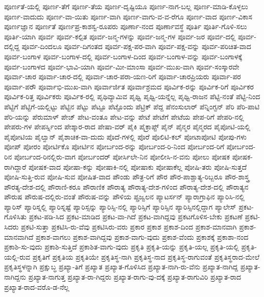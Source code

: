 {ಪೂರ್ಣತೆ-ಯಲ್ಲಿ
ಪೂರ್ಣ-ತೆಗೆ
ಪೂರ್ಣ-ತೆಯ
ಪೂರ್ಣ-ದೃಷ್ಟಿಯೂ
ಪೂರ್ಣ-ನಾಗ-ಬಲ್ಲ
ಪೂರ್ಣ-ಮಾಡಿ-ಕೊಳ್ಳಲು
ಪೂರ್ಣ-ವಾದುದು
ಪೂರ್ಣ-ವಾ-ಯಿತು
ಪೂರ್ಣ-ವಾಗಿ
ಪೂರ್ಣ-ವಾಗು-ವ-ವ-ರೆಗೂ
ಪೂರ್ಣ-ವಾದ
ಪೂರ್ಣ-ವಿಕಾಸ
ಪೂರ್ಣಜ್ಞಾನ
ಪೂರ್ಣತೆ
ಪೂರ್ಣಪ್ರ-ಕಾಶಸ್ವ-ರೂಪರು
ಪೂರ್ಣಾ-ನಂದ
ಪೂರ್ಣಾವಸ್ಥೆ
ಪೂರ್ತಿ
ಪೂರ್ತಿ-ಗೊಳಿ-ಸಲು
ಪೂರ್ತಿ-ಯಾಗಿ
ಪೂರ್ವ
ಪೂರ್ವ-ಕಲ್ಪಿತ
ಪೂರ್ವ-ಜನ್ಮ-ಗಳನ್ನು
ಪೂರ್ವ-ಜನ್ಮ-ಗಳ
ಪೂರ್ವ-ಜರ
ಪೂರ್ವ-ದಲ್ಲಿ
ಪೂರ್ವ-ದಲ್ಲಿದ್ದ
ಪೂರ್ವ-ದಿಂದಲೂ
ಪೂರ್ವ-ದಿಗಂತದ
ಪೂರ್ವ-ಪಕ್ಷ-ಪರ-ವಾಗಿ
ಪೂರ್ವ-ಪಕ್ಷ-ವನ್ನು
ಪೂರ್ವ-ಪರಿಚಿತ-ವಾದ
ಪೂರ್ವ-ಬಂಗಾಳ
ಪೂರ್ವ-ಬಂಗಾಳ-ದಲ್ಲಿ
ಪೂರ್ವ-ಬಂಗಾಳ-ದಿಂದ
ಪೂರ್ವ-ಬಂಗಾಳ-ವನ್ನು
ಪೂರ್ವ-ಬಂಗಾಳಕ್ಕೆ
ಪೂರ್ವ-ಬಂಗಾಳದ
ಪೂರ್ವ-ಭಾವಿ-ಯಾಗಿ
ಪೂರ್ವ-ಮೀ-ಮಾಂಸಾ
ಪೂರ್ವ-ಮುಖ-ವಾಗಿ
ಪೂರ್ವ-ಸಂಸ್ಕಾರವೇ
ಪೂರ್ವಾ-ಚಾರ
ಪೂರ್ವಾ-ಚಾರ-ದಲ್ಲಿ
ಪೂರ್ವಾ-ಚಾರ-ಪರಾ-ಯಣ-ರಿಗೆ
ಪೂರ್ವಾ-ಚಾರಪ್ರಿಯರು
ಪೂರ್ವಾ-ಪರ
ಪೂರ್ವಾ-ಪರೌ
ಪೂರ್ವಾಭಿ-ಮುಖ-ವಾಗಿ
ಪೂರ್ವಾರ್ಜಿತ
ಪೂರ್ವಾಶ್ರಮದ
ಪೂರ್ವಿಕ-ರನ್ನು
ಪೂರ್ವಿಕ-ರಿಗೆ
ಪೂರ್ವಿಕರ
ಪೂರ್ವಿಕ-ರಿತ್ತ
ಪೂರ್ವಿಕರು
ಪೂರ್ವಿಕ-ರಲ್ಲಿ
ಪೃಥಿವ್ಯಾಮಿವ
ಪೃಥ್ವಿ
ಪೃಥ್ವಿ-ಯನ್ನೆಲ್ಲ
ಪೃಥ್ವಿ-ರಾಜನ
ಪೆಟ್ಟಿ-ನಂತೆ
ಪೆಟ್ಟಿ-ನಿಂದ
ಪೆಟ್ಟಿಗೆ
ಪೆಟ್ಟಿಗೆ-ಯಲ್ಲಿಟ್ಟು
ಪೆಟ್ಟಿನ
ಪೆಟ್ಟು
ಪೆಟ್ಟೂ
ಪೆಟ್ಟೊಂದು
ಪೆಟ್ರಿಕ್
ಪೆದ್ದ
ಪೆನಂಸುಲಾರ್
ಪೆನ್ನಿಂಗ್ಟನ್
ಪೆರಿ
ಪೆರಿ-ಪಾಟಿ
ಪೆರಿ-ಯನ್ನು
ಪೆರುಮಾಳ್
ಪೇಜ್
ಪೇಟ-ವಂತೂ
ಪೇಟ-ವನ್ನು
ಪೇಟೆ
ಪೇಟೆಗೆ
ಪೇಟೆಯ
ಪೇಪ-ರಿಗೆ
ಪೇಪರಿ-ನಲ್ಲಿ
ಪೇಪರು-ಗಳ
ಪೇಪರ್ಸ್ನಿಂದ
ಪೇಶ್ಕಾರ-ರಾದ
ಪೇಷಾ-ವರ್
ಪೈಕಿ
ಪೈಕ್ರಾಪ್ಟ್
ಪೈನ್
ಪೈನ್ಮರ
ಪೈನ್ಮರದ
ಪೈಪೋಟಿ-ಯಲ್ಲಿ
ಪೈಪೋಟಿಯ
ಪೈಲ್ವಾನ್
ಪೈಶಾಚಿಕ-ವಾ-ದುದು
ಪೊದೆ-ಗಳಲ್ಲಿ
ಪೊರೆ
ಪೊಲಿಟಿ-ಕಲ್
ಪೋಟಾಪೋಟಿ
ಪೋಪು-ಗಳು
ಪೋಪ್
ಪೋರಂ
ಪೋರ್ಟಿಕೊ
ಪೋರ್ಟಿನ
ಪೋರ್ಬಂದ-ರನ್ನು
ಪೋರ್ಬಂದ-ರಿ-ನಿಂದ
ಪೋರ್ಬಂದ-ರಿಗೆ
ಪೋರ್ಬಂದ-ರಿನ
ಪೋರ್ಬಂದ-ರಿನಲ್ಲಿರು-ವಾಗ
ಪೋರ್ಬಂದರ್
ಪೋರ್ಸಿಲೇ-ನಿನ
ಪೋಲೀಸಿ-ನ-ವನು
ಪೋಲು
ಪೋಷಕ
ಪೋಷಕ-ರಾಗಿದ್ದಾರೆ
ಪೋಷಕ-ವಾದ
ಪೋಷಾ-ಕನ್ನು
ಪೋಷಾಕಿ-ನಲ್ಲಿ
ಪೋಷಾಕು
ಪೋಷಾಕೆಲ್ಲ
ಪೋಷಿ-ತರು
ಪೋಷಿ-ಸುತ್ತದೆ
ಪೋಷಿ-ಸುತ್ತಿ-ರುವ
ಪೋಷಿ-ಸುವ
ಪೋಷಿತ-ವಾದ
ಪೌಂಡು
ಪೌತ್ರ-ರಿಗೆ
ಪೌರ
ಪೌರ-ಪಾಶ್ಚಾತ್ಯ-ರಿಬ್ಬರೂ
ಪೌರ-ಶಾಸ್ತ್ರ
ಪೌರತ್ಯ-ದೇಶ-ದಲ್ಲಿ
ಪೌರಾಣಿ-ಕರೂ
ಪೌರಾಣಿಕ
ಪೌರಾತ್ಯ
ಪೌರಾತ್ಯ-ದೇಶ-ಗಳಿಂದ
ಪೌರಾತ್ಯ-ದೇಶ-ದಲ್ಲಿ
ಪೌರಾತ್ಯನ
ಪೌರುಷ
ಪೌರುಷ-ದಲ್ಲಿರು-ವಂತೆ
ಪೌರುಷ-ವನ್ನು
ಪೌಳಿಯ
ಪ್ಪ್ರಜ್ವಲನ
ಪ್ಯಾಟರ್ಸನ್
ಪ್ಯಾರಾಗ್ರಾಫಿನ
ಪ್ಯಾರಿಸಿ-ನಲ್ಲಿ
ಪ್ಯಾರಿಸ್
ಪ್ಯಾರಿಸ್ನಲ್ಲಿ
ಪ್ಯಾರಿಸ್ನಷ್ಟೆ
ಪ್ಯಾರಿಸ್ಸನ್ನು
ಪ್ಯಾರಿಸ್ಸಿ-ನಲ್ಲಿ
ಪ್ಯಾರಿಸ್ಸಿಗೆ
ಪ್ಯಾರಿಸ್ಸಿನ
ಪ್ಯಾರಿಸ್ಸಿನಲ್ಲಿದ್ದಾಗ
ಪ್ಯಾಲೇಸ್
ಪ್ರಕಟ-ಗೊಳಿಸಿತು
ಪ್ರಕಟ-ಪಡಿ-ಸಿದ
ಪ್ರಕಟ-ಮಾಡಿದ
ಪ್ರಕಟ-ವಾ-ಗಿದೆ
ಪ್ರಕಟ-ವಾಗಿದ್ದವು
ಪ್ರಕಟಗೊಳಿಸ-ಬೇಕು
ಪ್ರಕಟಣೆ
ಪ್ರಕಟಿ-ಸಿದರು
ಪ್ರಕಟಿ-ಸುತ್ತಾ
ಪ್ರಕಟಿಸಿ-ರು-ವೆವು
ಪ್ರಕಟಿಸಿರು-ವರು
ಪ್ರಕಾರ
ಪ್ರಕಾಶ
ಪ್ರಕಾಶ-ದಿಂದ
ಪ್ರಕಾಶ-ಮಾನವಾಗಿ
ಪ್ರಕಾಶ-ಮಾನವಾಗಿದೆ
ಪ್ರಕಾಶ-ವಾಗಲು
ಪ್ರಕಾಶ-ವಾಗಿದ್ದವು
ಪ್ರಕಾಶ-ವಾಗು-ವುದು
ಪ್ರಕಾಶ-ವೆಂದು
ಪ್ರಕಾಶಕ್ಕೆ
ಪ್ರಕಾಶಾ-ನಂದ
ಪ್ರಕಾಶಿ-ಸು-ವುದು
ಪ್ರಕಾಶಿ-ಸುತ್ತಿದೆ
ಪ್ರಕಾಶಿತ-ವಾಗು-ವುದು
ಪ್ರಕೃತಿ
ಪ್ರಕೃತಿ-ಯನ್ನು
ಪ್ರಕೃತಿ-ಯಲ್ಲ
ಪ್ರಕೃತಿ-ಯಲ್ಲಿ
ಪ್ರಕೃತಿ-ಯಲ್ಲಿ-ರುವ
ಪ್ರಕೃತಿಗೆ
ಪ್ರಕೃತಿಯ
ಪ್ರಕೃತಿಯೇ
ಪ್ರಕೃತಿಸ್ಥ-ನಾಗಿ
ಪ್ರಕೃತಿಸ್ಥ-ನಾದ
ಪ್ರಕೃತಿಸ್ಥ-ರಾಗುವಂತೆ
ಪ್ರಕೃತಿಸ್ಥರಾದ-ಮೇಲೆ
ಪ್ರಕೃತಿಸ್ಥಳನ್ನಾಗಿ
ಪ್ರಕ್ಷುಬ್ಧ
ಪ್ರಖ್ಯಾ-ತಿಗೆ
ಪ್ರಖ್ಯಾತ
ಪ್ರಖ್ಯಾತ-ಗೊಳಿಸಿದ
ಪ್ರಖ್ಯಾತ-ನಾಗಿ-ರು-ವೆನು
ಪ್ರಖ್ಯಾತ-ನಾಗಿದ್ದ
ಪ್ರಖ್ಯಾತ-ನಾಗಿದ್ದನು
ಪ್ರಖ್ಯಾತ-ನಾಗುತ್ತ
ಪ್ರಖ್ಯಾತ-ರಾ-ಗಿದ್ದರು
ಪ್ರಖ್ಯಾತ-ರಾಗು-ವು-ದಕ್ಕೆ
ಪ್ರಖ್ಯಾತ-ರಾಗುವಿರಿ
ಪ್ರಖ್ಯಾತ-ರಾದ
ಪ್ರಖ್ಯಾತ-ರಾದ-ವರೊ-ಡ-ನೆಲ್ಲ
}
